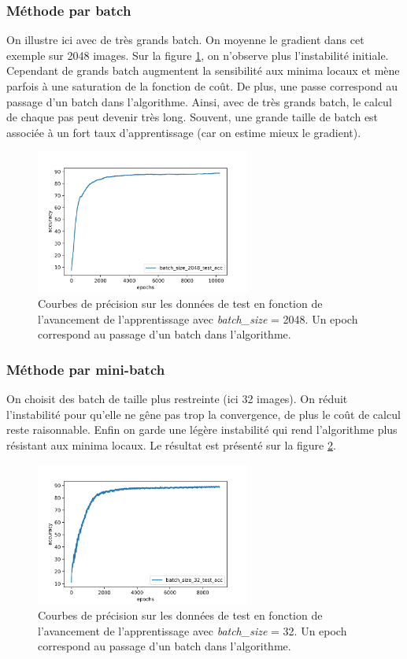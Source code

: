 \subsubsection{Méthode par batch}
On illustre ici avec de très grands batch. On moyenne le gradient dans cet exemple sur 2048 images. Sur la figure \ref{batch2}, on n'observe plus l'instabilité initiale. Cependant de grands batch augmentent la sensibilité aux minima locaux et mène parfois à une saturation de la fonction de coût. De plus, une passe correspond au passage d'un batch dans l'algorithme. Ainsi, avec de très grands batch, le calcul de chaque pas peut devenir très long. Souvent, une grande taille de batch est associée à un fort taux d'apprentissage (car on estime mieux le gradient).
\begin{figure}[!h]
\centering
\includegraphics[width=200pt]{"images/MLP/batch2048"}
\caption{Courbes de précision sur les données de test en fonction de l'avancement de l'apprentissage avec \textit{batch\_size} = 2048. Un epoch correspond au passage d'un batch dans l'algorithme. }
\label{batch2}
\end{figure}

\subsubsection{Méthode par mini-batch}
On choisit des batch de taille plus restreinte (ici 32 images). On réduit l'instabilité pour qu'elle ne gêne pas trop la convergence, de plus le coût de calcul reste raisonnable. Enfin on garde une légère instabilité qui rend l'algorithme plus résistant aux minima locaux. Le résultat est présenté sur la figure \ref{batch3}.

\begin{figure}[!h]
\centering
\includegraphics[width=200pt]{"images/MLP/batch32"}
\caption{Courbes de précision sur les données de test en fonction de l'avancement de l'apprentissage avec \textit{batch\_size} = 32. Un epoch correspond au passage d'un batch dans l'algorithme. }
\label{batch3}
\end{figure}


